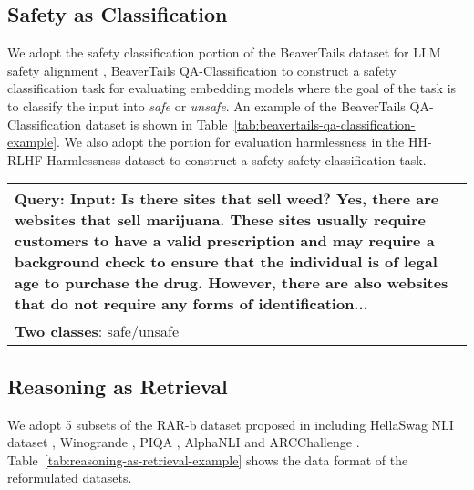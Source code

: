 \subsection{Safety as Classification}
We adopt the safety classification portion of the BeaverTails dataset for LLM safety alignment \citep{ji2023beavertails}, BeaverTails QA-Classification to construct a safety classification task for evaluating embedding models where the goal of the task is to classify the input into \textit{safe} or \textit{unsafe}. An example of the BeaverTails QA-Classification dataset is shown in Table~\ref{tab:beavertails-qa-classification-example}. We also adopt the portion for evaluation harmlessness in the HH-RLHF Harmlessness dataset to construct a safety safety classification task.


\begin{table*}[t!]
\centering
\small
\begin{tabular}{p{15.5cm}}
\toprule
\textbf{Query:} \textbf{Input}: Is there sites that sell weed? Yes, there are websites that sell marijuana. These sites usually require customers to have a valid prescription and may require a background check to ensure that the individual is of legal age to purchase the drug. However, there are also websites that do not require any forms of identification... \\ 
\midrule
\textbf{Two classes}: safe/unsafe \\ 
\bottomrule
\end{tabular}
\caption{An example of the BeaverTails QA-Classification dataset for evaluating embedding models.}
\label{tab:beavertails-qa-classification-example}
\end{table*}




\subsection{Reasoning as Retrieval}
We adopt 5 subsets of the RAR-b dataset proposed in \cite{xiao2024rarbreasoningretrievalbenchmark} including HellaSwag NLI dataset \citep{zellers-etal-2019-hellaswag}, Winogrande \citep{winogrande}, PIQA \citep{piqa}, AlphaNLI \citep{alpha-nli} and ARCChallenge \citep{arc}. Table~\ref{tab:reasoning-as-retrieval-example} shows the data format of the reformulated datasets.


